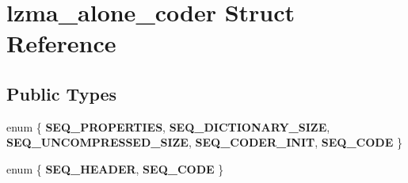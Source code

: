\section{lzma\+\_\+alone\+\_\+coder Struct Reference}
\label{structlzma__alone__coder}
\subsection*{Public Types}
\begin{DoxyCompactItemize}
\item 
\mbox{\label{structlzma__alone__coder_a70cc8358882bc546b603ec93ca22a821}} 
enum \{ \newline
{\bfseries S\+E\+Q\+\_\+\+P\+R\+O\+P\+E\+R\+T\+I\+ES}, 
{\bfseries S\+E\+Q\+\_\+\+D\+I\+C\+T\+I\+O\+N\+A\+R\+Y\+\_\+\+S\+I\+ZE}, 
{\bfseries S\+E\+Q\+\_\+\+U\+N\+C\+O\+M\+P\+R\+E\+S\+S\+E\+D\+\_\+\+S\+I\+ZE}, 
{\bfseries S\+E\+Q\+\_\+\+C\+O\+D\+E\+R\+\_\+\+I\+N\+IT}, 
\newline
{\bfseries S\+E\+Q\+\_\+\+C\+O\+DE}
 \}
\item 
\mbox{\label{structlzma__alone__coder_afe009517db68f4eefec5e7c567d69a4e}} 
enum \{ {\bfseries S\+E\+Q\+\_\+\+H\+E\+A\+D\+ER}, 
{\bfseries S\+E\+Q\+\_\+\+C\+O\+DE}
 \}
\end{DoxyCompactItemize}
